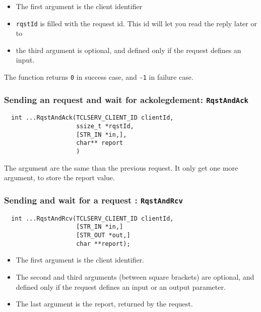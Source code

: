 \begin{itemize}
\item The first argument is the client identifier

\item \texttt{rqstId} is filled with the request id. This id will let you
read the reply later or to 

\item the third argument is optional, and defined only if the request defines
an input.
\end{itemize}

The function returns \texttt{0} in success case, and \texttt{-1} in failure case.

\subsubsection{Sending an request and wait for ackolegdement: \texttt{RqstAndAck}}

\begin{center}\begin{cartouche}\small\begin{verbatim}
  int ...RqstAndAck(TCLSERV_CLIENT_ID clientId,
                    ssize_t *rqstId, 
                    [STR_IN *in,],
                    char** report
					)
\end{verbatim}\end{cartouche}\end{center}

The argument are the same than the previous request. It only get one more
argument, to store the report value.

\subsubsection{Sending and wait for a request :  \texttt{RqstAndRcv}}

\begin{center}\begin{cartouche}\small\begin{verbatim}
  int ...RqstAndRcv(TCLSERV_CLIENT_ID clientId,
                    [STR_IN *in,] 
                    [STR_OUT *out,] 
                    char **report);
\end{verbatim}\end{cartouche}\end{center}
\begin{itemize}
\item The first argument is the client identifier.

\item The second and third arguments (between square brackets) are
optional, and defined only if the request defines an input or an output
parameter.

\item The last argument is the report, returned by the request. 
\end{itemize}

